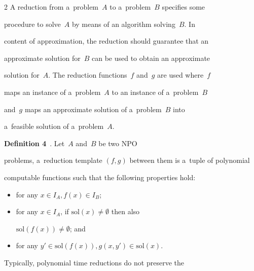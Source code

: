 \begin{multicols}{2}
A reduction from a~problem~$A$ to a~problem~$B$ specifies some


procedure to solve~$A$ by means of an algorithm solving~$B$. In


content of approximation, the reduction should guarantee that an


approximate solution for~$B$ can be used to obtain an approximate


solution for~$A$. The reduction functions~$f$ and~$g$ are used where~$f$


maps an instance of a~problem~$A$ to an instance of a~problem~$B$


and~$g$ maps an approximate solution of a~problem~$B$ into


a~feasible solution of a~problem~$A$.





\smallskip





\noindent


\textbf{Definition 4}~\cite{TrevisanLuca}. Let~$A$ and~$B$ be two {NPO}


problems, a~reduction template $(f,g)$ between them is a~tuple of polynomial


computable functions such that the following properties hold:


\begin{itemize}


\item for any $x \in I_{A}, f(x) \in I_{B}$;\\[-14pt]


\item for any $x \in I_{A}$, if  $\mathrm{sol}\left(x\right) \neq \emptyset$ then also


$\mathrm{sol}\left(f(x)\right) \neq \emptyset$; and\\[-14pt]


\item for any $y' \in \mathrm{sol}\left(f(x)\right),g(x,y') \in \mathrm{sol}\left(x\right)$.


\end{itemize}





\smallskip





Typically, polynomial time reductions do not preserve the



\end{multicols}
